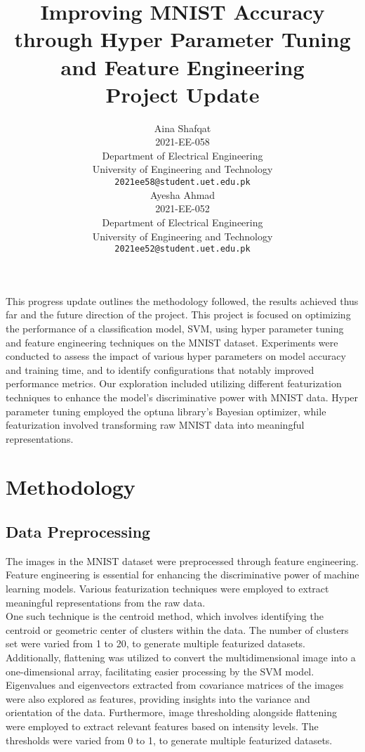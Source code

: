 \documentclass{article}
\title{Improving MNIST Accuracy through Hyper Parameter Tuning and Feature Engineering \\ Project Update}
\author{
  Aina Shafqat \\
  2021-EE-058 \\
  Department of Electrical Engineering \\
  University of Engineering and Technology \\
  \texttt{2021ee58@student.uet.edu.pk} \\
  \And
  Ayesha Ahmad \\
  2021-EE-052 \\
  Department of Electrical Engineering \\
  University of Engineering and Technology \\
  \texttt{2021ee52@student.uet.edu.pk} \\
}
\begin{document}
\maketitle

This progress update outlines the methodology followed, the results achieved thus far and the future direction of the project. This project is focused on optimizing the performance of a classification model, SVM, using hyper parameter tuning and feature engineering techniques on the MNIST dataset. Experiments were conducted to assess the impact of various hyper parameters on model accuracy and training time, and to identify configurations that notably improved performance metrics. Our exploration included utilizing different featurization techniques to enhance the model's discriminative power with MNIST data. Hyper parameter tuning employed the optuna library's Bayesian optimizer, while featurization involved transforming raw MNIST data into meaningful representations. 

\section{Methodology}

\subsection{Data Preprocessing}

The images in the MNIST dataset were preprocessed through feature engineering. Feature engineering is essential for enhancing the discriminative power of machine learning models. Various featurization techniques were employed to extract meaningful representations from the raw data. 
\\
One such technique is the centroid method, which involves identifying the centroid or geometric center of clusters within the data. The number of clusters set were varied from 1 to 20, to generate multiple featurized datasets.
Additionally, flattening was utilized to convert the multidimensional image into a one-dimensional array, facilitating easier processing by the SVM model. 
\\
Eigenvalues and eigenvectors extracted from covariance matrices of the images were also explored as features, providing insights into the variance and orientation of the data. 
Furthermore, image thresholding alongside flattening were employed to extract relevant features based on intensity levels. The thresholds were varied from 0 to 1, to generate multiple featurized datasets.
\end{document}
